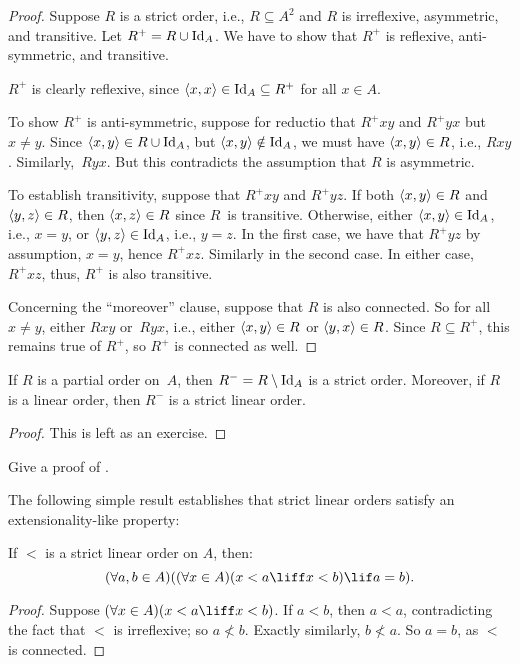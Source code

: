 \documentclass[../../../include/open-logic-section]{subfiles}
\begin{document}
\begin{proof}
Suppose $R$ is a strict order, i.e., $R \subseteq A^2$ and $R$ is
irreflexive, asymmetric, and transitive. Let $R^+ = R \cup \mathord{\mathrm{Id}_{A}}$. We
have to show that $R^+$ is reflexive, anti-symmetric, and transitive.

$R^+$ is clearly reflexive, since $\langle x, x \rangle \in \mathord{\mathrm{Id}_{A}} \subseteq
R^+$ for all $x \in A$. 

To show $R^+$ is anti-symmetric, suppose for reductio that $R^+xy$ and
$R^+yx$ but $x \neq y$. Since $\langle x,y \rangle \in R \cup \mathord{\mathrm{Id}_{A}}$, but
$\langle x, y \rangle \notin \mathord{\mathrm{Id}_{A}}$, we must have $\langle x, y \rangle \in R$, i.e.,
$Rxy$. Similarly,~$Ryx$. But this contradicts the assumption
that $R$ is asymmetric.

To establish transitivity, suppose that $R^+xy$ and $R^+yz$. If both
$\langle x, y \rangle \in R$ and $\langle y,z \rangle \in R$, then $\langle x, z \rangle \in
R$ since $R$~is transitive. Otherwise, either $\langle x, y \rangle \in
\mathord{\mathrm{Id}_{A}}$, i.e., $x = y$, or $\langle y, z \rangle \in \mathord{\mathrm{Id}_{A}}$, i.e., $y = z$.
In the first case, we have that $R^+yz$ by assumption, $x = y$, hence
$R^+xz$. Similarly in the second case. In either case, $R^+xz$, thus,
$R^+$ is also transitive.

Concerning the ``moreover'' clause, suppose that $R$ is also connected. 
So for all $x \neq y$, either $Rxy$ or~$Ryx$, i.e., either 
$\langle x, y \rangle \in R$ or $\langle y, x \rangle \in R$. Since $R \subseteq R^+$, 
this remains true of $R^+$, so $R^+$ is connected as well.
\end{proof}

\begin{prop}
If $R$ is a partial order on~$A$, then $R^- = R \setminus \mathord{\mathrm{Id}_{A}}$ is a
strict order. Moreover, if $R$ is a linear order, then $R^-$ is a strict 
linear order.
\end{prop}

\begin{proof}
This is left as an exercise.
\end{proof}

\begin{prob}
Give a proof of . 
\end{prob}

The following simple result establishes that strict linear orders
satisfy an extensionality-like property:

\begin{prop}
If $<$ is a strict linear order on $A$, then:
\[
  (\forall a, b \in A)((\forall x \in A)(x < a \liff x < b) \lif a = b).
\]
\end{prop}

\begin{proof}
Suppose $(\forall x \in A)(x < a \liff x < b)$. If $a < b$, then $a <
a$, contradicting the fact that $<$ is irreflexive; so $a \nless b$.
Exactly similarly, $b \nless a$. So $a = b$, as $<$ is connected.
\end{proof}
\end{document}
